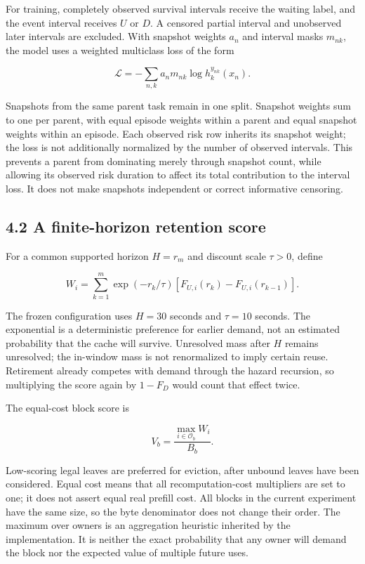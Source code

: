 \documentclass[
  english,
  10pt,
]{article}
\begin{document}
For training, completely observed survival intervals receive the waiting
label, and the event interval receives \(U\) or \(D\). A censored
partial interval and unobserved later intervals are excluded. With
snapshot weights \(a_n\) and interval masks \(m_{nk}\), the model uses a
weighted multiclass loss of the form

\[
\mathcal L=-\sum_{n,k}a_n m_{nk}\log h_k^{y_{nk}}(x_n).
\]

Snapshots from the same parent task remain in one split. Snapshot
weights sum to one per parent, with equal episode weights within a
parent and equal snapshot weights within an episode. Each observed risk
row inherits its snapshot weight; the loss is not additionally
normalized by the number of observed intervals. This prevents a parent
from dominating merely through snapshot count, while allowing its
observed risk duration to affect its total contribution to the interval
loss. It does not make snapshots independent or correct informative
censoring.

\subsection{4.2 A finite-horizon retention
score}\label{a-finite-horizon-retention-score}

For a common supported horizon \(H=r_m\) and discount scale \(\tau>0\),
define

\[
W_i=\sum_{k=1}^{m}\exp(-r_k/\tau)
\left[F_{U,i}(r_k)-F_{U,i}(r_{k-1})\right].
\]

The frozen configuration uses \(H=30\) seconds and \(\tau=10\) seconds.
The exponential is a deterministic preference for earlier demand, not an
estimated probability that the cache will survive. Unresolved mass after
\(H\) remains unresolved; the in-window mass is not renormalized to
imply certain reuse. Retirement already competes with demand through the
hazard recursion, so multiplying the score again by \(1-F_D\) would
count that effect twice.

The equal-cost block score is

\[
V_b=\frac{\max_{i\in\mathcal O_b}W_i}{B_b}.
\]

Low-scoring legal leaves are preferred for eviction, after unbound
leaves have been considered. Equal cost means that all
recomputation-cost multipliers are set to one; it does not assert equal
real prefill cost. All blocks in the current experiment have the same
size, so the byte denominator does not change their order. The maximum
over owners is an aggregation heuristic inherited by the implementation.
It is neither the exact probability that any owner will demand the block
nor the expected value of multiple future uses.
\end{document}
